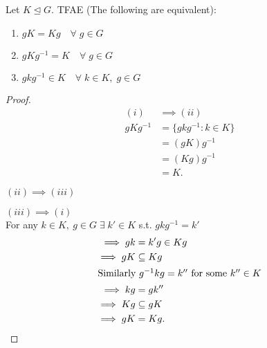 \begin{proposition}
\protect\hypertarget{prp:four}{}\label{prp:four}

Let $K \trianglelefteq G$.
TFAE (The following are equivalent):

\begin{enumerate}
\def\labelenumi{\roman{enumi}.}
\item
  $gK = Kg \quad \forall \; g \in G$
\item
  $gKg^{-1} = K \quad \forall \; g \in G$
\item
  $gkg^{-1} \in K \quad \forall \; k \in K,\; g \in G$
\end{enumerate}

\end{proposition}

\begin{proof}
\begin{align*}
    (i) &\implies (ii) \\
    gKg^{-1} &= \{gkg^{-1} : k \in K \} \\
    &= (gK) g^{-1} \\
    &= (Kg)g^{-1} \\
    &= K.
\end{align*}

$(ii) \implies (iii)$

$(iii) \implies (i)$ \\
For any $k \in K,\ g \in G \; \exists \; k' \in K$ s.t. $gkg^{-1} = k'$
  \begin{align*}
    \implies gk &= k'g \in Kg \\
    \implies gK &\subseteq Kg \\
    \intertext{Similarly $g^{-1}kg = k''$ for some $k'' \in K$}
    \implies kg &= gk'' \\
    \implies Kg &\subseteq gK \\
    \implies gK &= Kg.
  \end{align*}
\end{proof}

